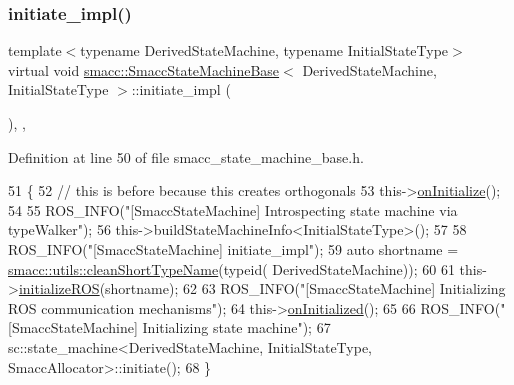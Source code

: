 \subsubsection{\texorpdfstring{initiate\+\_\+impl()}{initiate\_impl()}}
{\footnotesize\ttfamily template$<$typename Derived\+State\+Machine, typename Initial\+State\+Type$>$ \\
virtual void \hyperlink{structsmacc_1_1SmaccStateMachineBase}{smacc\+::\+Smacc\+State\+Machine\+Base}$<$ Derived\+State\+Machine, Initial\+State\+Type $>$\+::initiate\+\_\+impl (\begin{DoxyParamCaption}{ }\end{DoxyParamCaption})\hspace{0.3cm}{\ttfamily [inline]}, {\ttfamily [override]}, {\ttfamily [virtual]}}



Definition at line 50 of file smacc\+\_\+state\+\_\+machine\+\_\+base.\+h.


\begin{DoxyCode}
51     \{
52         \textcolor{comment}{// this is before because this creates orthogonals}
53         this->\hyperlink{classsmacc_1_1ISmaccStateMachine_ac2982c6c8283663e5e1e8a7c82f511ec}{onInitialize}();
54 
55         ROS\_INFO(\textcolor{stringliteral}{"[SmaccStateMachine] Introspecting state machine via typeWalker"});
56         this->buildStateMachineInfo<InitialStateType>();
57 
58         ROS\_INFO(\textcolor{stringliteral}{"[SmaccStateMachine] initiate\_impl"});
59         \textcolor{keyword}{auto} shortname =  \hyperlink{namespacesmacc_1_1utils_aacd1975bb7cd9bec4b50e111a2ae7edb}{smacc::utils::cleanShortTypeName}(\textcolor{keyword}{typeid}(
      DerivedStateMachine));
60 
61         this->\hyperlink{classsmacc_1_1ISmaccStateMachine_a1136dd5d81e846ac86de48bc71912cbf}{initializeROS}(shortname);        
62 
63         ROS\_INFO(\textcolor{stringliteral}{"[SmaccStateMachine] Initializing ROS communication mechanisms"});
64         this->\hyperlink{classsmacc_1_1ISmaccStateMachine_a95e7f71d0d88fffd0afebb1f9ccdade5}{onInitialized}();
65 
66         ROS\_INFO(\textcolor{stringliteral}{"[SmaccStateMachine] Initializing state machine"});
67         sc::state\_machine<DerivedStateMachine, InitialStateType, SmaccAllocator>::initiate();
68     \}
\end{DoxyCode}
\mbox{\label{structsmacc_1_1SmaccStateMachineBase_af34aec9fa012f0e3858131c84abfd5ed}} 
